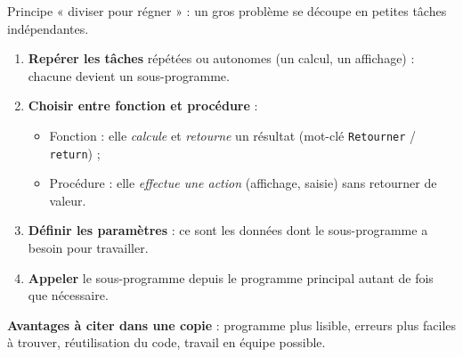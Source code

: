 \documentclass[11pt]{article}
\newcommand{\cle}[1]{{\popxbold\color{popdark}#1}}
\begin{document}
\begin{methode}
Principe « \cle{diviser pour régner} » : un gros problème se découpe en petites tâches indépendantes.
\begin{enumerate}
\item \textbf{Repérer les tâches} répétées ou autonomes (un calcul, un affichage) : chacune devient un sous-programme.
\item \textbf{Choisir entre fonction et procédure} :
\begin{itemize}
\item \cle{Fonction} : elle \emph{calcule} et \emph{retourne} un résultat (mot-clé \texttt{Retourner} / \texttt{return}) ;
\item \cle{Procédure} : elle \emph{effectue une action} (affichage, saisie) sans retourner de valeur.
\end{itemize}
\item \textbf{Définir les paramètres} : ce sont les données dont le sous-programme a besoin pour travailler.
\item \textbf{Appeler} le sous-programme depuis le programme principal autant de fois que nécessaire.
\end{enumerate}
\textbf{Avantages à citer dans une copie} : programme plus lisible, erreurs plus faciles à trouver, réutilisation du code, travail en équipe possible.
\end{methode}
\end{document}
